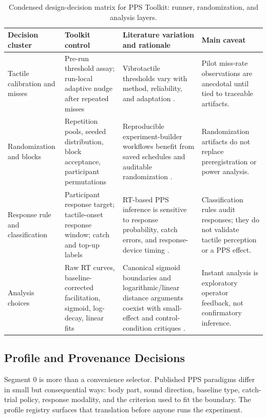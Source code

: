 \documentclass[pdflatex,sn-apa]{sn-jnl}
\begin{document}
\begin{table}[t]
\caption{Condensed design-decision matrix for PPS Toolkit: runner, randomization, and analysis layers.}
\label{tab:matrix-runner}
\footnotesize
\setlength{\tabcolsep}{3pt}
\begin{tabularx}{\textwidth}{>{\raggedright\arraybackslash}p{} >{\raggedright\arraybackslash}p{} >{\raggedright\arraybackslash}X >{\raggedright\arraybackslash}p{}}
\toprule
Decision cluster & Toolkit control & Literature variation and rationale & Main caveat \\
\midrule
Tactile calibration and misses & Pre-run threshold assay; run-local adaptive nudge after repeated misses & Vibrotactile thresholds vary with method, reliability, and adaptation \citep{Merchel2020,Mikkelsen2020,Morioka2002,Goble1993,Pate2024}. & Pilot miss-rate observations are anecdotal until tied to traceable artifacts. \\
Randomization and blocks & Repetition pools, seeded distribution, block acceptance, participant permutations & Reproducible experiment-builder workflows benefit from saved schedules and auditable randomization \citep{AnwylIrvine2018,Peirce2019,Ellis2024}. & Randomization artifacts do not replace preregistration or power analysis. \\
Response rule and classification & Participant response target; tactile-onset response window; catch and top-up labels & RT-based PPS inference is sensitive to response probability, catch errors, and response-device timing \citep{Holmes2020,Canzoneri2012,Roussel2025,Bridges2020}. & Classification rules audit responses; they do not validate tactile perception or a PPS effect. \\
Analysis choices & Raw RT curves, baseline-corrected facilitation, sigmoid, log-decay, linear fits & Canonical sigmoid boundaries and logarithmic/linear distance arguments coexist with small-effect and control-condition critiques \citep{Canzoneri2012,Hobeika2019,Holmes2020}. & Instant analysis is exploratory operator feedback, not confirmatory inference. \\
\bottomrule
\end{tabularx}
\end{table}

\subsection{Profile and Provenance Decisions}

Segment 0 is more than a convenience selector. Published PPS paradigms differ in small but consequential ways: body part, sound direction, baseline type, catch-trial policy, response modality, and the criterion used to fit the boundary. The profile registry surfaces that translation before anyone runs the experiment.
\end{document}
